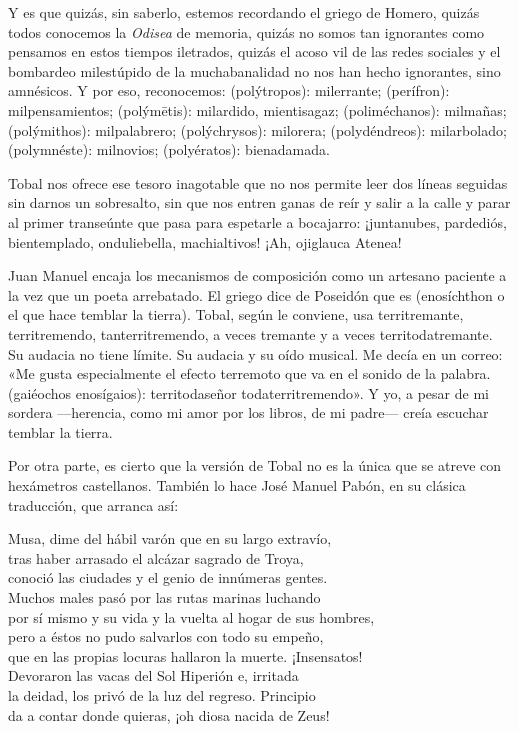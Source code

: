 Y es que quizás, sin saberlo, estemos recordando el griego de Homero, quizás todos conocemos la \emph{Odisea} de memoria, quizás no somos tan ignorantes como pensamos en estos tiempos iletrados, quizás el acoso vil de las redes sociales y el bombardeo milestúpido de la muchabanalidad no nos han hecho ignorantes, sino amnésicos. Y por eso, reconocemos:  (polýtropos): milerrante;  (perífron): milpensamientos;  (polýmētis): milardido, mientisagaz;  (poliméchanos): milmañas;  (polýmithos): milpalabrero;  (polýchrysos): milorera;  (polydéndreos): milarbolado;  (polymnéste): milnovios;  (polyératos): bienadamada.

Tobal nos ofrece ese tesoro inagotable que no nos permite leer dos líneas seguidas sin darnos un sobresalto, sin que nos entren ganas de reír y salir a la calle y parar al primer transeúnte que pasa para espetarle a bocajarro: ¡juntanubes, pardediós, bientemplado, onduliebella, machialtivos! ¡Ah, ojiglauca Atenea!

Juan Manuel encaja los mecanismos de composición como un artesano paciente a la vez que un poeta arrebatado. El griego dice de Poseidón que es  (enosíchthon o el que hace temblar la tierra). Tobal, según le conviene, usa territremante, territremendo, tanterritremendo, a veces tremante y a veces territodatremante. Su audacia no tiene límite. Su audacia y su oído musical. Me decía en un correo: «Me gusta especialmente el efecto terremoto que va en el sonido de la palabra.  (gaiéochos enosígaios): territodaseñor todaterritremendo». Y yo, a pesar de mi sordera ---herencia, como mi amor por los libros, de mi padre--- creía escuchar temblar la tierra.

Por otra parte, es cierto que la versión de Tobal no es la única que se atreve con hexámetros castellanos. También lo hace José Manuel Pabón, en su clásica traducción, que arranca así:

\begin{versocita}
Musa, dime del hábil varón que en su largo extravío,\\
tras haber arrasado el alcázar sagrado de Troya,\\
conoció las ciudades y el genio de innúmeras gentes.\\
Muchos males pasó por las rutas marinas luchando\\
por sí mismo y su vida y la vuelta al hogar de sus hombres,\\
pero a éstos no pudo salvarlos con todo su empeño,\\
que en las propias locuras hallaron la muerte. ¡Insensatos!\\
Devoraron las vacas del Sol Hiperión e, irritada\\
la deidad, los privó de la luz del regreso. Principio\\
da a contar donde quieras, ¡oh diosa nacida de Zeus!
\end{versocita}


